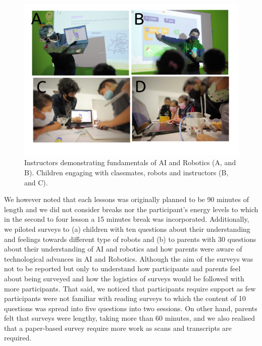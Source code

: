 \documentclass[conference]{IEEEtran}
\begin{document}
\begin{figure}[tbp]
    \centerline{\includegraphics[width=\linewidth]{drawing-v00.png}} %
    \caption{
        Instructors demonstrating fundamentals of AI and Robotics (A, and B). 
        Children engaging with classmates, robots and instructors (B, and C).
        }
    \label{fig:pilot}
\end{figure}

We however noted that each lessons was originally planned to be 90 minutes of length and we did not consider breaks nor the participant's energy levels to which in the second to four lesson a 15 minutes break was incorporated.
Additionally, we piloted surveys to (a) children with ten questions about their understanding and feelings towards different type of robots and (b) to parents with 30 questions about their understanding of AI and robotics and how parents were aware of  technological advances in AI and Robotics.
Although the aim of the surveys was not to be reported but only to understand how participants and parents feel about being surveyed and how the logistics of surveys would be followed with more participants.
That said, we noticed that participants require support as few participants were not familiar with reading surveys to which the content of 10 questions was spread into five questions into two sessions.
On other hand, parents felt that surveys were lengthy, taking more than 60 minutes, and we also realised that a paper-based survey require more work as scans and transcripts are required. 
\end{document}

